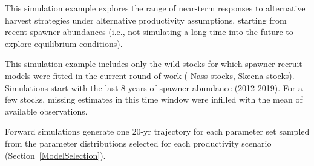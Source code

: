 \documentclass[french,11pt]{book}
\begin{document}
This simulation example explores the range of near-term responses to alternative harvest strategies under alternative productivity assumptions, starting from recent spawner abundances (i.e., not simulating a long time into the future to explore equilibrium conditions).

This simulation example includes only the  wild stocks for which spawner-recruit models were fitted in the current round of work ( Nass stocks,  Skeena stocks). Simulations start with the last 8 years of spawner abundance (2012-2019). For a few stocks, missing estimates in this time window were infilled with the mean of available observations.

Forward simulations generate one 20-yr trajectory for each parameter set sampled from the parameter distributions selected for each productivity scenario (Section~\ref{ModelSelection}).
\end{document}
